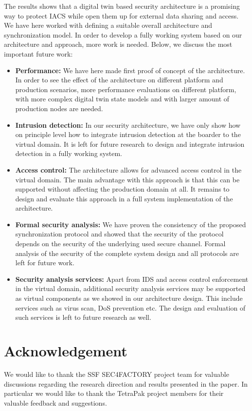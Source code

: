The results shows that a digital twin based security architecture is a promising way to protect IACS while open them up for external data sharing and access. We have here worked with defining a suitable overall architecture and synchronization model. In order to develop a fully working system based on our architecture and approach, more work is needed. Below, we discuss the most important future work:
\begin{itemize}
\item \textbf{Performance:} We have here made first proof of concept of the architecture. In order to see the effect of the architecture on different platform and production scenarios, more performance evaluations on different platform, with more complex digital twin state models and with larger amount of production nodes are needed. 
\item \textbf{Intrusion detection:} In our security architecture, we have only show how on principle level how  to integrate intrusion detection at the boarder to the virtual domain. It is left for future research to design and integrate intrusion detection in a fully working system.
\item \textbf{Access control:} The architecture allows for advanced access control in the virtual domain. The main advantage with this approach is that this can be supported without affecting the production domain at all. It remains to design and evaluate this approach in a full system implementation of the architecture.
\item\textbf{Formal security analysis:} We have proven the consistency of the proposed synchronization protocol and showed that the security of the protocol depends on the security of the underlying used secure channel. Formal analysis of the security of the complete system design and all protocols are left for future work. 
\item \textbf{Security analysis services:} Apart from IDS and access control enforcement in the virtual domain, additional security analysis services may be supported as virtual components as we showed in our architecture design. This include services such as virus scan, DoS prevention etc. The design and evaluation of such services is left to future research as well.
\end{itemize}

\section*{Acknowledgement}
We would like to thank the SSF SEC4FACTORY project team for valuable discussions regarding the research direction and results presented in the paper. In particular we would like to thank the TetraPak project members for their valuable feedback and suggestions.

{\raggedright
        \printbibliography[segment=\therefsegment,heading=subbibliography]
}

